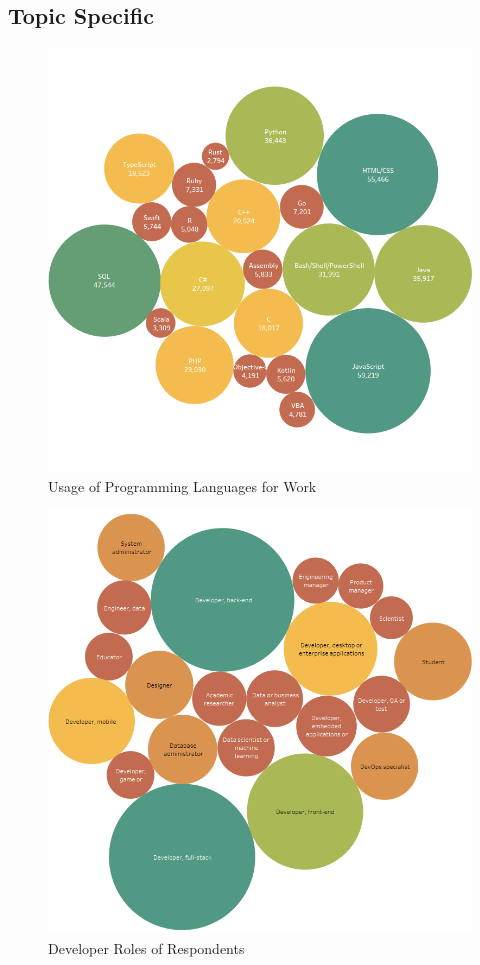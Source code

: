 \documentclass[listof=totoc]{scrartcl}
\begin{document}
\subsection{Topic Specific}
\label{subsection:topicspecific}
\begin{figure}
    \centering
    \includegraphics[width=\textwidth]{Documentation/images/languages.png}
    \caption{Usage of Programming Languages for Work}
    \label{fig:languages}
\end{figure}
\begin{figure}
    \centering
    \includegraphics[width=\textwidth]{Documentation/images/types.png}
    \caption{Developer Roles of Respondents}
    \label{fig:devtypes}
\end{figure}
\end{document}
